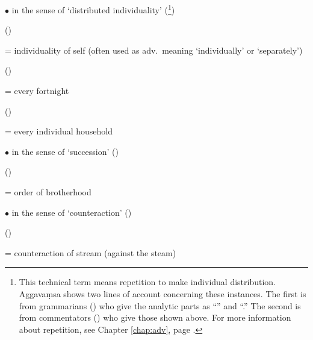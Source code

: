 $\bullet$  in the sense of `distributed individuality' (\footnote{This technical term means repetition to make individual distribution. Aggava\d msa shows two lines of account concerning these instances. The first is from grammarians () who give the analytic parts as ``'' and ``.'' The second is from commentators () who give those shown above. For more information about repetition, see Chapter \ref{chap:adv}, page \pageref{sec:repetition}.})\par
{} ()\par \hspace{3mm} = individuality of self (often used as adv.\ meaning `individually' or `separately')\par
{} ()\par \hspace{3mm} = every fortnight\par
{} ()\par \hspace{3mm} = every individual household

$\bullet$  in the sense of `succession' ()\par
{} ()\par \hspace{3mm} = order of brotherhood

$\bullet$  in the sense of `counteraction' ()\par
{} ()\par \hspace{3mm} = counteraction of stream (against the steam)

